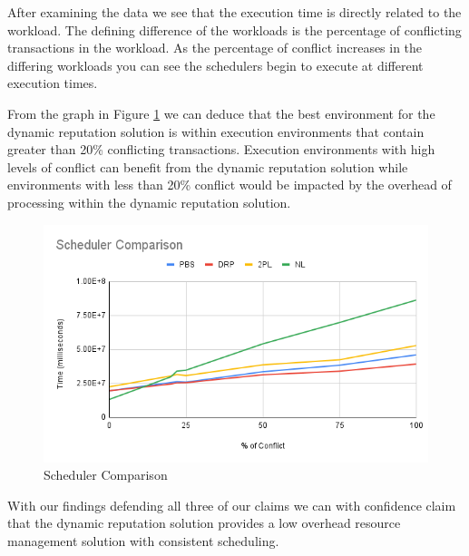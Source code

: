 After examining the data we see that the execution time is directly related to the workload. The defining difference of the workloads is the percentage of conflicting transactions in the workload. As the percentage of conflict increases in the differing workloads you can see the schedulers begin to execute at different execution times. 

From the graph in Figure \ref{image:scheduler_comparison} we can deduce that the best environment for the dynamic reputation solution is within execution environments that contain greater than 20\% conflicting transactions. Execution environments with high levels of conflict can benefit from the dynamic reputation solution while environments with less than 20\% conflict would be impacted by the overhead of processing within the dynamic reputation solution.

\begin{figure}
\centering
\includegraphics[scale=0.60]{images/SchedulerComparison.png}
\caption{Scheduler Comparison}
\label{image:scheduler_comparison}
\end{figure}

With our findings defending all three of our claims we can with confidence claim that the dynamic reputation solution provides a low overhead resource management solution with consistent scheduling.
